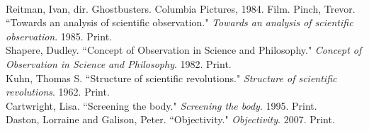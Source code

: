 \documentclass[11pt, oneside]{article}
\begin{document}
\begin{workscited}
\bibent \\
\bibent Reitman, Ivan, dir. Ghostbusters. Columbia Pictures, 1984. Film.
\bibent Pinch, Trevor. ``Towards an analysis of scientific observation."  \textit{Towards an analysis of scientific observation}.  1985. Print. \\
\bibent Shapere, Dudley. ``Concept of Observation in Science and Philosophy."  \textit{Concept of Observation in Science and Philosophy}.  1982. Print. \\
\bibent Kuhn, Thomas S. ``Structure of scientific revolutions."  \textit{Structure of scientific revolutions}.  1962. Print. \\
\bibent Cartwright, Lisa. ``Screening the body."  \textit{Screening the body}.  1995. Print. \\
\bibent Daston, Lorraine and Galison, Peter. ``Objectivity."  \textit{Objectivity}.  2007. Print. \\
\end{workscited}
\end{document}
